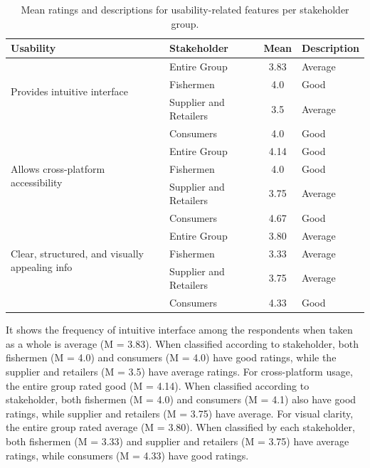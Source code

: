 \begin{table}[h]
	\centering
	\begin{tabular}{|l|l|c|l|}
		\hline
		\textbf{Usability} & \textbf{Stakeholder} & \textbf{Mean} & \textbf{Description} \\ \hline
		\multirow{3}{*}{Provides intuitive interface} 
		& Entire Group & 3.83 & Average \\ \cline{2-4}
		& Fishermen & 4.0 & Good \\ \cline{2-4}
		& Supplier and Retailers & 3.5 & Average \\ \cline{2-4}
		& Consumers & 4.0 & Good \\ \hline
		
		\multirow{3}{*}{Allows cross-platform accessibility} 
		& Entire Group & 4.14 & Good \\ \cline{2-4}
		& Fishermen & 4.0 & Good \\ \cline{2-4}
		& Supplier and Retailers & 3.75 & Average \\ \cline{2-4}
		& Consumers & 4.67 & Good \\ \hline
		
		\multirow{3}{*}{Clear, structured, and visually appealing info} 
		& Entire Group & 3.80 & Average \\ \cline{2-4}
		& Fishermen & 3.33 & Average \\ \cline{2-4}
		& Supplier and Retailers & 3.75 & Average \\ \cline{2-4}
		& Consumers & 4.33 & Good \\ \hline
		
	\end{tabular}
	\caption{Mean ratings and descriptions for usability-related features per stakeholder group.}
	\label{tab:usability}
\end{table}

It shows the frequency of intuitive interface among the respondents when taken as a whole is average (M = 3.83). When classified according to stakeholder, both fishermen (M = 4.0) and consumers (M = 4.0) have good ratings, while the supplier and retailers (M = 3.5) have average ratings. For cross-platform usage, the entire group rated good (M = 4.14). When classified according to stakeholder, both fishermen (M = 4.0) and consumers (M = 4.1) also have good ratings, while supplier and retailers (M = 3.75) have average. For visual clarity, the entire group rated average (M = 3.80). When classified by each stakeholder, both fishermen (M = 3.33) and supplier and retailers (M = 3.75) have average ratings, while consumers (M = 4.33)  have good ratings.

